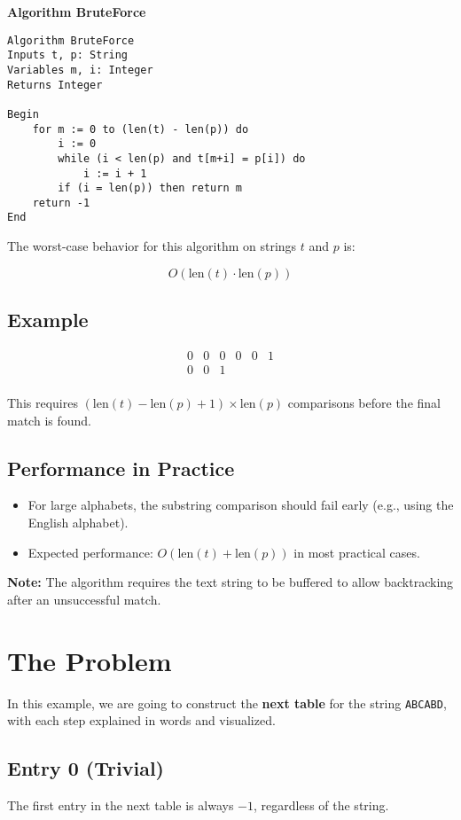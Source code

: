 \documentclass[a4paper,12pt]{article}
\begin{document}
\textbf{Algorithm BruteForce}

\begin{verbatim}
Algorithm BruteForce
Inputs t, p: String
Variables m, i: Integer
Returns Integer

Begin
    for m := 0 to (len(t) - len(p)) do
        i := 0
        while (i < len(p) and t[m+i] = p[i]) do
            i := i + 1
        if (i = len(p)) then return m
    return -1
End
\end{verbatim}

The worst-case behavior for this algorithm on strings \(t\) and \(p\) is:

\[
O(\text{len}(t) \cdot \text{len}(p))
\]

\subsection*{Example}
\[
\begin{array}{cccccc}
0 & 0 & 0 & 0 & 0 & 1 \\
0 & 0 & 1 \\
\end{array}
\]

This requires \((\text{len}(t) - \text{len}(p) + 1) \times \text{len}(p)\) comparisons before the final match is found.

\subsection*{Performance in Practice}
\begin{itemize}
    \item For large alphabets, the substring comparison should fail early (e.g., using the English alphabet).
    \item Expected performance: \(O(\text{len}(t) + \text{len}(p))\) in most practical cases.
\end{itemize}

\textbf{Note:} The algorithm requires the text string to be buffered to allow backtracking after an unsuccessful match.

\section*{The Problem}
In this example, we are going to construct the \textbf{next table} for the string \texttt{ABCABD}, with each step explained in words and visualized.

\subsection*{Entry 0 (Trivial)}
\begin{tcolorbox}[colback=blue!5, colframe=blue!75!black, title=Entry 0 (Trivial)]
The first entry in the next table is always \(-1\), regardless of the string.
\end{tcolorbox}
\end{document}
